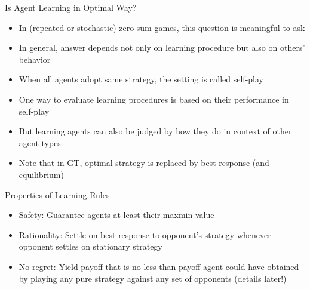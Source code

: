 \documentclass[11pt,aspectratio=169,handout]{beamer}
\begin{document}
  
  \begin{frame}{Is Agent Learning in Optimal Way?}
   \begin{itemize}[<+->]\small
   \setlength{\itemsep}{0.7em}
    \item In (repeated or stochastic) zero-sum games, this question is meaningful to ask
    \item In general, answer depends not only on learning procedure but also on others' behavior
    \item When all agents adopt same strategy, the setting is called \alert{self-play}
    \item One way to evaluate learning procedures is based on their performance in self-play
    \item But learning agents can also be judged by how they do in context of other agent types
    \item Note that in GT, \alert{optimal strategy} is replaced by \alert{best response} (and equilibrium)
   \end{itemize}
  \end{frame}
  
  
  \begin{frame}{Properties of Learning Rules}
   \begin{itemize}[<+->]
   \setlength{\itemsep}{1.5em}
    \item \alert{Safety}: Guarantee agents at least their maxmin value
    \item \alert{Rationality}: Settle on best response to opponent's strategy whenever opponent settles on stationary strategy
    \item \alert{No regret}: Yield payoff that is no less than payoff agent could have obtained by playing any pure strategy against any set of opponents (details later!)
   \end{itemize}
  \end{frame}
  
\end{document}
